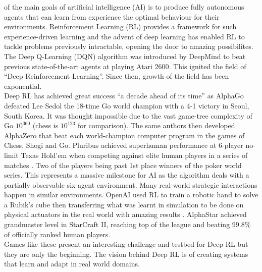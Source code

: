 \documentclass[10pt,journal,compsoc]{IEEEtran}
\begin{document}
% 
% 
% 
% 
 of the main goals of artificial intelligence (AI) is to produce fully autonomous agents that can learn from experience the optimal behaviour for their environments. Reinforcement Learning (RL) provides a framework for such experience-driven learning and the advent of deep learning has enabled RL to tackle problems previously intractable, opening the door to amazing possibilites.   The Deep Q-Learning (DQN) algorithm \cite{Mnih:DQN} was introduced by DeepMind to beat previous state-of-the-art agents at playing Atari 2600. This ignited the field of “Deep Reinforcement Learning”. Since then, growth of the field has been exponential.
\\
Deep RL has achieved great success ``a decade ahead of its time'' \cite{WEBSITE:DeepMind} as AlphaGo \cite{silver2016mastering} defeated Lee Sedol the 18-time Go world champion with a 4-1 victory in Seoul, South Korea. It was thought impossible due to the vast game-tree complexity of Go \begin{math}10^{360}\end{math} (chess is \begin{math}10^{123}\end{math} for comparison). 
The same authors then developed AlphaZero \cite{Silver:AlphaZero} that beat each world-champion computer program in the games of Chess, Shogi and Go.
Pluribus achieved superhuman performance at 6-player no-limit Texas Hold’em when competing against elite human players in a series of matches \cite{brown2019superhuman}. Two of the players being past 1st place winners of the poker world series. This represents a massive milestone for AI as the algorithm deals with a partially observable six-agent environment. Many real-world strategic interactions happen in similar environments.
OpenAI used RL to train a robotic hand to solve a Rubik’s cube then transferring what was learnt in simulation to be done on physical actuators in the real world with amazing results \cite{akkaya2019solving}. 
AlphaStar \cite{vinyals2019grandmaster} achieved grandmaster level in StarCraft II, reaching top of the league and beating 99.8\% of officially ranked human players.
\\
Games like these present an interesting challenge and testbed for Deep RL but they are only the beginning. The vision behind Deep RL is of creating systems that learn and adapt in real world domains.
\end{document}
